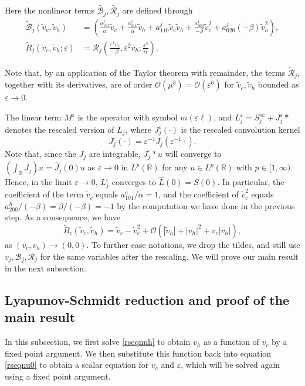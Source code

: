\documentclass[letterpaper,11pt]{article}
\newcommand{\R}{\mathbb{R}}
\newcommand{\rmO}{\mathcal{O}}
\newcommand{\eps}{\varepsilon}
\newcommand{\B}{\mathcal{B}}
\newcommand{\Rm}{\mathcal{R}}
\numberwithin{equation}{section}
\theoremstyle{plain}
\theoremstyle{remark}
\begin{document}
Here the nonlinear terms $\tilde{\B_j}, \tilde{\Rm_j}$ are defined through 
\begin{align*}
\tilde{\B}_j(\tilde{v}_c,\tilde{v}_h)&=\left(\frac{a^j_{101}}{\alpha}  \tilde{v}_c+\frac{a^j_{011}}{\alpha} \tilde{v}_h+a^j_{110}\tilde{v}_c\tilde{v}_h + \frac{a^j_{200}}{-\beta}\tilde{ v}_c^2+a^j_{020}(-\beta)\tilde{v}_h^2 \right),\\
\tilde{R}_j ( \tilde{v}_c,\tilde{v}_h;\eps)&=\Rm_j \left(\frac{\eps^2\tilde{v}_c}{-\beta},\eps^2\tilde{v}_h;\frac{\eps^2}{\alpha}\right).
\end{align*}
 
Note that, by an application of the Taylor theorem with remainder, the terms $\tilde{\Rm}_j$, together with its derivatives, are of order $\rmO(\mu^3) =\rmO( \eps^6)$ for $\tilde{v}_c,\tilde{v}_h$ bounded as $\eps\to 0$. 

The linear term $M^\eps $ is the operator with symbol $m(\eps \ell)$,  and $L_j^\eps = S^\infty_j+ J_j^\eps \ast$ denotes the rescaled version of $L_j$, where $J_j^\eps(\cdot)$ is the rescaled convolution kernel
\[ 
J_j^\eps(\cdot) = \eps^{-1}J_j(\eps^{-1}\cdot).
\]
Note that, since the $J_j$ are integrable, $J_j^\eps \ast u$ will converge to $\left(\int_\R J_j\right) u= \widehat{J}_j(0) u$ as $\eps \to 0$ in $L^p(\R)$ for any $u \in L^p(\R)$ with $p \in [1,\infty)$. Hence, in the limit $\eps \to 0$, $L^\eps_j$ converges to $\widehat{L}(0) = S(0)$. In particular, the coefficient of the term $\tilde{v}_c$ equals $ a_{101}^c/\alpha=1$, and the coefficient of $\tilde{v}_c^2$ equals $a_{200}^h/(-\beta)=\beta/(-\beta)=-1$ by the computation we have done in the previous step. As a consequence, we have 
\[
\tilde{B}_c(\tilde{v}_c,\tilde{v}_h) = \tilde{v}_c-\tilde{v}_c^2 + \rmO(|\tilde{v}_h|+|v_h|^2+v_c|v_h|),
\] as $(v_c,v_h) \to (0,0)$. 
To further ease notations, we drop the tildes, and still use $v_j,\B_j,\Rm_j$ for the same variables after the rescaling. We will prove our main result in the next subsection.



\subsection{Lyapunov-Schmidt reduction and proof of the main result}
In this subsection, we first solve \eqref{rseqnuh} to obtain $v_h$ as a function of $v_c$ by a fixed point argument. We then substitute this function back into equation \eqref{rseqnu0} to obtain a scalar equation for $v_c$ and $\eps$, which will be solved again using a fixed point argument.
\end{document}
